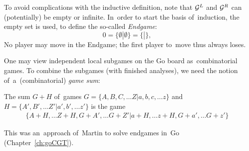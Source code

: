 To avoid complications with the inductive definition, note that $\mathcal{G}^L$ and $\mathcal{G}^R$ can (potentially) be empty or infinite.
In~order to start the basis of~induction, the empty set is used, to define the so-called \emph{Endgame}\footnotemark{}:
\[
  0 = \{ \emptyset | \emptyset \} = \{ | \},
\]
No player may move in the Endgame; the first player to~move thus always loses.

One may view independent local subgames on the Go board as~combinatorial games.
To combine the subgames (with finished analyses), we need the notion of~a~(combinatorial) \emph{game sum}:
\begin{framed}
  \begin{defn}
    The sum $G + H$ of~games $G = \{ A, B, C, \ldots Z | a, b, c, \ldots z \}$ and $H = \{ A', B', \ldots Z' | a', b', \ldots z' \}$ is the game
    \begin{align*}
      \{ A+H, \ldots Z+H,
         G+A', \ldots G+Z' |
         a+H, \ldots z+H,
         G+a', \ldots G+z' \}
    \end{align*}
  \end{defn}
\end{framed}
This was an~approach of~Martin \Mueller{} to solve endgames in~Go (Chapter~\ref{ch:goCGT}).
